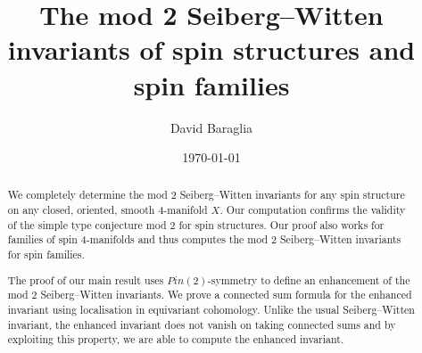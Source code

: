 \documentclass{amsart}
\theoremstyle{definition}
\theoremstyle{remark}
\numberwithin{equation}{section}
\begin{document}
\setlength\parskip{0.5em plus 0.1em minus 0.2em}

\title[The mod 2 Seiberg--Witten invariants of spin structures]{The mod 2 Seiberg--Witten invariants of spin structures and spin families}
\author{David Baraglia}


\address{School of Mathematical Sciences, Adelaide University, Adelaide SA 5005, Australia}





\date{\today}


\begin{abstract}
We completely determine the mod $2$ Seiberg--Witten invariants for any spin structure on any closed, oriented, smooth $4$-manifold $X$. Our computation confirms the validity of the simple type conjecture mod $2$ for spin structures. Our proof also works for families of spin $4$-manifolds and thus computes the mod $2$ Seiberg--Witten invariants for spin families.

The proof of our main result uses $Pin(2)$-symmetry to define an enhancement of the mod $2$ Seiberg--Witten invariants. We prove a connected sum formula for the enhanced invariant using localisation in equivariant cohomology. Unlike the usual Seiberg--Witten invariant, the enhanced invariant does not vanish on taking connected sums and by exploiting this property, we are able to compute the enhanced invariant.


\end{abstract}

\maketitle

\end{document}
